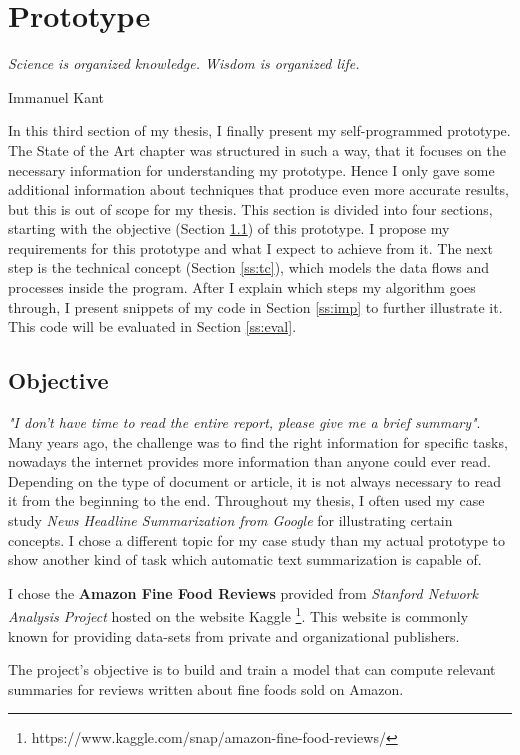 \chapter{Prototype}\label{ch:proto}

\epigraph{\textit{Science is organized knowledge. Wisdom is organized life.}}{Immanuel Kant}

In this third section of my thesis, I finally present my self-programmed prototype. The State of the Art chapter was structured in such a way, that it focuses on the necessary information for understanding my prototype. Hence I only gave some additional information about techniques that produce even more accurate results, but this is out of scope for my thesis. This section is divided into four sections, starting with the objective (Section \ref{ss:obj}) of this prototype. I propose my requirements for this prototype and what I expect to achieve from it. The next step is the technical concept (Section \ref{ss:tc}), which models the data flows and processes inside the program. After I explain which steps my algorithm goes through, I present snippets of my code in Section \ref{ss:imp} to further illustrate it. This code will be evaluated in Section \ref{ss:eval}.

\section{Objective}\label{ss:obj}

\textit{"I don't have time to read the entire report, please give me a brief summary"}. Many years ago, the challenge was to find the right information for specific tasks, nowadays the internet provides more information than anyone could ever read. Depending on the type of document or article, it is not always necessary to read it from the beginning to the end. Throughout my thesis, I often used my case study \textit{News Headline Summarization from Google} for illustrating certain concepts. I chose a different topic for my case study than my actual prototype to show another kind of task which automatic text summarization is capable of.

I chose the \textbf{Amazon Fine Food Reviews} provided from \textit{Stanford Network Analysis Project} hosted on the website Kaggle \footnote{https://www.kaggle.com/snap/amazon-fine-food-reviews/}. This website is commonly known for providing data-sets from private and organizational publishers. 

The project's objective is to build and train a model that can compute relevant summaries for reviews written about fine foods sold on Amazon. 


